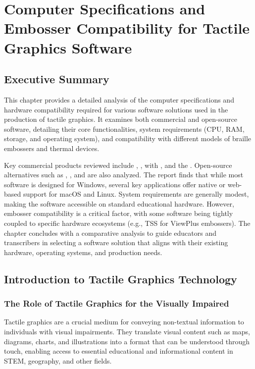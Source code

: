 \chapter{Computer Specifications and Embosser Compatibility for Tactile Graphics Software}\label{ch14:tactile-graphics-specs}
\raggedright

\section{Executive Summary}\label{ch14:sec:executive-summary}
This chapter provides a detailed analysis of the computer specifications and hardware compatibility required for various software solutions used in the production of tactile graphics. It examines both commercial and open-source software, detailing their core functionalities, system requirements (CPU, RAM, storage, and operating system), and compatibility with different models of braille embossers and thermal devices.

Key commercial products reviewed include , ,  with , and the . Open-source alternatives such as , , and  are also analyzed. The report finds that while most software is designed for Windows, several key applications offer native or web-based support for macOS and Linux. System requirements are generally modest, making the software accessible on standard educational hardware. However, embosser compatibility is a critical factor, with some software being tightly coupled to specific hardware ecosystems (e.g., TSS for ViewPlus embossers). The chapter concludes with a comparative analysis to guide educators and transcribers in selecting a software solution that aligns with their existing hardware, operating systems, and production needs.

\section{Introduction to Tactile Graphics Technology}\label{ch14:sec:introduction}
\subsection{The Role of Tactile Graphics for the Visually Impaired}\label{ch14:ssec:role-of-tactile-graphics}
Tactile graphics are a crucial medium for conveying non-textual information to individuals with visual impairments. They translate visual content such as maps, diagrams, charts, and illustrations into a format that can be understood through touch, enabling access to essential educational and informational content in STEM, geography, and other fields.

